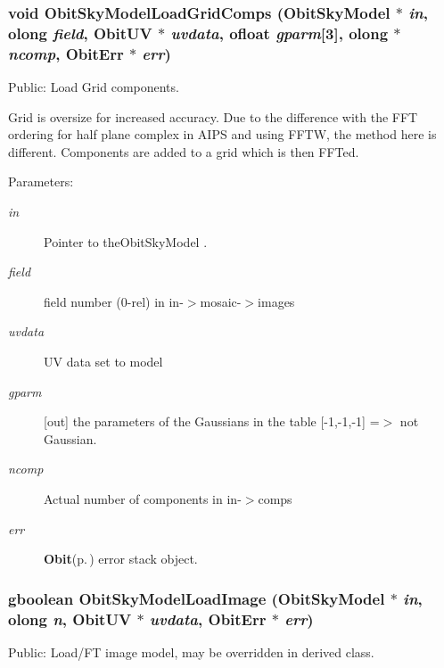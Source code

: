 \subsubsection{\setlength{\rightskip}{0pt plus 5cm}void Obit\-Sky\-Model\-Load\-Grid\-Comps ({\bf Obit\-Sky\-Model} $\ast$ {\em in}, {\bf olong} {\em field}, {\bf Obit\-UV} $\ast$ {\em uvdata}, {\bf ofloat} {\em gparm}[3], {\bf olong} $\ast$ {\em ncomp}, {\bf Obit\-Err} $\ast$ {\em err})}\label{ObitSkyModel_8c_a39}


Public: Load Grid components. 

Grid is oversize for increased accuracy. Due to the difference with the FFT ordering for half plane complex in AIPS and using FFTW, the method here is different. Components are added to a grid which is then FFTed. \begin{Desc}
\item[Parameters:]
\begin{description}
\item[{\em in}]Pointer to the\-Obit\-Sky\-Model . \item[{\em field}]field number (0-rel) in in-$>$mosaic-$>$images \item[{\em uvdata}]UV data set to model \item[{\em gparm}][out] the parameters of the Gaussians in the table [-1,-1,-1] =$>$ not Gaussian. \item[{\em ncomp}]Actual number of components in in-$>$comps \item[{\em err}]{\bf Obit}{\rm (p.\,\pageref{structObit})} error stack object. \end{description}
\end{Desc}
\subsubsection{\setlength{\rightskip}{0pt plus 5cm}gboolean Obit\-Sky\-Model\-Load\-Image ({\bf Obit\-Sky\-Model} $\ast$ {\em in}, {\bf olong} {\em n}, {\bf Obit\-UV} $\ast$ {\em uvdata}, {\bf Obit\-Err} $\ast$ {\em err})}\label{ObitSkyModel_8c_a27}


Public: Load/FT image model, may be overridden in derived class. 

